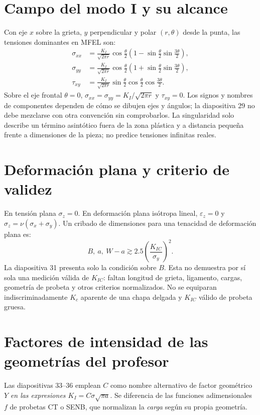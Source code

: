 \section{Campo del modo I y su alcance}
Con eje $x$ sobre la grieta, $y$ perpendicular y polar $(r,\theta)$ desde la punta, las tensiones dominantes en MFEL son:
\begin{align}
\sigma_{xx}&=\frac{K_I}{\sqrt{2\pi r}}\cos\frac{\theta}{2}
\left(1-\sin\frac{\theta}{2}\sin\frac{3\theta}{2}\right),\\
\sigma_{yy}&=\frac{K_I}{\sqrt{2\pi r}}\cos\frac{\theta}{2}
\left(1+\sin\frac{\theta}{2}\sin\frac{3\theta}{2}\right),\\
\tau_{xy}&=\frac{K_I}{\sqrt{2\pi r}}\sin\frac{\theta}{2}
\cos\frac{\theta}{2}\cos\frac{3\theta}{2}.
\end{align}
Sobre el eje frontal $\theta=0$, $\sigma_{xx}=\sigma_{yy}=K_I/\sqrt{2\pi r}$ y $\tau_{xy}=0$. Los signos y nombres de componentes dependen de cómo se dibujen ejes y ángulos; la diapositiva 29 no debe mezclarse con otra convención sin comprobarlos. La singularidad solo describe un término asintótico fuera de la zona plástica y a distancia pequeña frente a dimensiones de la pieza; no predice tensiones infinitas reales.

\section{Deformación plana y criterio de validez}
En tensión plana $\sigma_z=0$. En deformación plana isótropa lineal, $\varepsilon_z=0$ y $\sigma_z=\nu(\sigma_x+\sigma_y)$. Un cribado de dimensiones para una tenacidad de deformación plana es:
\begin{equation}
B,\ a,\ W-a\gtrsim2.5\left(\frac{K_{IC}}{\sigma_y}\right)^2.
\label{eq:clase-validez}
\end{equation}
La diapositiva 31 presenta solo la condición sobre $B$. Esta no demuestra por sí sola una medición válida de $K_{IC}$: faltan longitud de grieta, ligamento, cargas, geometría de probeta y otros criterios normalizados. No se equiparan indiscriminadamente $K_c$ aparente de una chapa delgada y $K_{IC}$ válido de probeta gruesa.

\section{Factores de intensidad de las geometrías del profesor}
Las diapositivas 33--36 emplean $C$ como nombre alternativo de factor geométrico $Y$ \emph{en las expresiones $K_I=C\sigma\sqrt{\pi a}$}. Se diferencia de las funciones adimensionales $f$ de probetas CT o SENB, que normalizan la \emph{carga} según su propia geometría.


